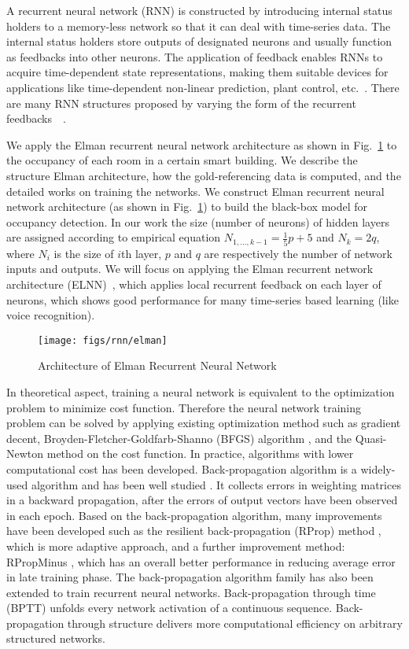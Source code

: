 A recurrent neural network (RNN) is constructed by introducing
internal status holders to a memory-less network so that it can deal
with time-series data. The internal status holders store outputs of
designated neurons and usually function as feedbacks into other
neurons. The application of feedback enables RNNs to acquire
time-dependent state representations, making them suitable devices for
applications like time-dependent non-linear prediction, plant control,
etc.~\cite{zhao8}. There are many RNN structures
proposed by varying the form of the recurrent
feedbacks~~\cite{zhao6,zhao8,zhao17}.

We apply the Elman recurrent neural network architecture as shown in
Fig.~\ref{fig:elman} to the occupancy of each room in a certain smart building.
We describe the structure Elman architecture, how the gold-referencing data is
computed, and the detailed works on training the networks. We construct Elman recurrent neural network architecture (as shown in Fig.~\ref{fig:elman}) to build the black-box model for occupancy detection. In
our work the size (number of neurons) of hidden layers are assigned according
to empirical equation $N_{1,\ldots,k-1}=\frac15p+5$ and $N_k=2q$, where $N_i$
is the size of $i$th layer, $p$ and $q$ are respectively the number of network
inputs and outputs. We will focus on applying the Elman recurrent network
architecture (ELNN)~\cite{zhao6}, which applies local
recurrent feedback on each layer of neurons, which shows good
performance for many time-series based learning (like voice
recognition).

\begin{figure}[t]
    \centering
    \texttt{[image: figs/rnn/elman]}
    \caption{Architecture of Elman Recurrent Neural Network}
    \label{fig:elman}
\end{figure}


In theoretical aspect, training a neural network is equivalent to the optimization problem to minimize cost function. Therefore the neural network training problem can be solved by applying existing optimization method such as gradient decent, Broyden-Fletcher-Goldfarb-Shanno (BFGS) algorithm
\cite{zhao9}, and the Quasi-Newton method on the cost function. In practice, algorithms with lower computational cost has been developed. Back-propagation algorithm is a widely-used algorithm and has been well studied \cite{zhao10}. It collects errors in weighting matrices in a backward propagation, after the errors of output vectors have been observed in each epoch. Based on the back-propagation algorithm, many improvements have been developed such as the resilient back-propagation (RProp) method \cite{zhao18}, which is more adaptive approach, and a further improvement method: RPropMinus \cite{zhao11}, which has an overall better performance in reducing average error in late training phase. The back-propagation algorithm family has also been extended to train recurrent neural networks. Back-propagation through time (BPTT) \cite{zhao20} unfolds every network activation of a
continuous sequence. Back-propagation through structure delivers more computational efficiency on
arbitrary structured networks.
